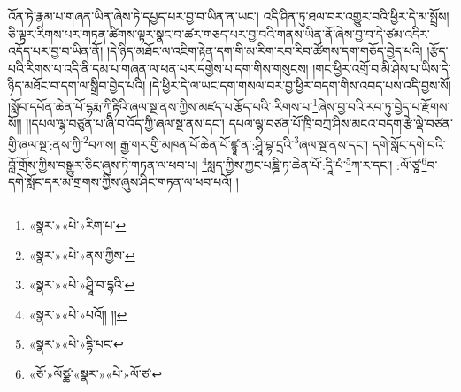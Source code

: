 འོན་ཏེ་རྣམ་པ་གཞན་ཡིན་ཞེས་ཏེ་དཔྱད་པར་བྱ་བ་ཡིན་ན་ཡང་། འདི་ཤིན་ཏུ་ཐལ་བར་འགྱུར་བའི་ཕྱིར་དེ་མ་སྤྲོས། ཅི་ལྟར་རིགས་པར་གཏན་ཚིགས་ལྟར་སྣང་བ་ཚར་གཅད་པར་བྱ་བའི་གནས་ཡིན་ནོ་ཞེས་བྱ་བ་དེ་ཙམ་འདིར་འདོད་པར་བྱ་བ་ཡིན་ནོ། །དེ་ཉིད་མཐོང་ལ་འཇིག་རྟེན་དག་གི་མ་རིག་རབ་རིབ་ཚོགས་དག་གཅོད་བྱེད་པའི། །རྩོད་པའི་རིགས་པ་འདི་ནི་དམ་པ་གཞན་ལ་ཕན་པར་དགྱེས་པ་དག་གིས་གསུངས། །གང་ཕྱིར་འགྲོ་བ་མི་ཤེས་པ་ཡིས་དེ་ཉིད་མཐོང་བ་དག་ལ་སྒྲིབ་བྱེད་པའི། །དེ་ཕྱིར་དེ་ལ་ཡང་དག་གསལ་བར་བྱ་ཕྱིར་བདག་གིས་འབད་པས་འདི་བྱས་སོ། །སློབ་དཔོན་ཆེན་པོ་དྷརྨ་ཀཱིརྟིའི་ཞལ་སྔ་ནས་ཀྱིས་མཛད་པ་རྩོད་པའི་:རིགས་པ་\footnote{«སྣར་»«པེ་»རིག་པ་}ཞེས་བྱ་བའི་རབ་ཏུ་བྱེད་པ་རྫོགས་སོ།། །།དཔལ་ལྷ་བཙུན་པ་ཞི་བ་འོད་ཀྱི་ཞལ་སྔ་ནས་དང་། དཔལ་ལྷ་བཙན་པོ་ཁྲི་བཀྲ་ཤིས་མངའ་བདག་རྩེ་ལྡེ་བཙན་གྱི་ཞལ་སྔ་:ནས་ཀྱི་\footnote{«སྣར་»«པེ་»ནས་ཀྱིས་}བཀས། རྒྱ་གར་གྱི་མཁན་པོ་ཆེན་པོ་ཛྙཱ་ན་:ཤྲཱི་བྷ་དྲའི་\footnote{«སྣར་»«པེ་»ཤྲཱི་བ་དྷའི་}ཞལ་སྔ་ནས་དང་། དགེ་སློང་དགེ་བའི་བློ་གྲོས་ཀྱིས་བསྒྱུར་ཅིང་ཞུས་ཏེ་གཏན་ལ་ཕབ་པ། \footnote{«སྣར་»«པེ་»པའོ།། །། }སླད་ཀྱིས་ཀྱང་པཎྜི་ཏ་ཆེན་པོ་:དཱི་པཾ་\footnote{«སྣར་»«པེ་»དྷི་པང་}ཀ་ར་དང་། :ལོ་ཙཱ་\footnote{«ཅོ་»ལོཙྪ་«སྣར་»«པེ་»ལོ་ཙ་}བ་དགེ་སློང་དར་མ་གྲགས་ཀྱིས་ཞུས་ཤིང་གཏན་ལ་ཕབ་པའོ། ། 